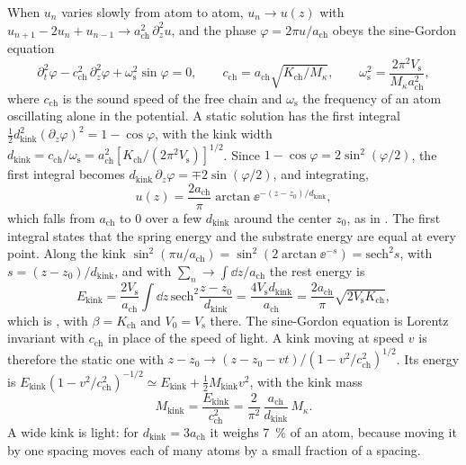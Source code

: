When $u_n$ varies slowly from atom to atom, $u_n \to u(z)$ with $u_{n+1} - 2u_n + u_{n-1} \to a_{\mathrm{ch}}^2\,\partial_z^2u$, and the phase $\varphi = 2\pi u/a_{\mathrm{ch}}$ obeys the sine-Gordon equation
\begin{equation}
  \partial_t^2\varphi - c_{\mathrm{ch}}^2\,\partial_z^2\varphi + \omega_{\mathrm{s}}^2\sin\varphi = 0, \qquad
  c_{\mathrm{ch}} = a_{\mathrm{ch}}\sqrt{K_{\mathrm{ch}}/M_\kappa}, \qquad \omega_{\mathrm{s}}^2 = \frac{2\pi^2V_{\mathrm{s}}}{M_\kappa a_{\mathrm{ch}}^2} ,
  \label{eq:C.20-sG}
\end{equation}
where $c_{\mathrm{ch}}$ is the sound speed of the free chain and $\omega_{\mathrm{s}}$ the frequency of an atom oscillating alone in the potential. A static solution has the first integral $\tfrac12d_{\mathrm{kink}}^2(\partial_z\varphi)^2 = 1 - \cos\varphi$, with the kink width $d_{\mathrm{kink}} = c_{\mathrm{ch}}/\omega_{\mathrm{s}} = a_{\mathrm{ch}}^2[K_{\mathrm{ch}}/(2\pi^2V_{\mathrm{s}})]^{1/2}$. Since $1 - \cos\varphi = 2\sin^2(\varphi/2)$, the first integral becomes $d_{\mathrm{kink}}\,\partial_z\varphi = \mp2\sin(\varphi/2)$, and integrating,
\begin{equation}
  u(z) = \frac{2a_{\mathrm{ch}}}{\pi}\arctan\ee^{-(z - z_0)/d_{\mathrm{kink}}} ,
  \label{eq:C.20-kink}
\end{equation}
which falls from $a_{\mathrm{ch}}$ to 0 over a few $d_{\mathrm{kink}}$ around the center $z_0$, as in \cite[Eq.~(2)]{fitzgerald2018structure}. The first integral states that the spring energy and the substrate energy are equal at every point. Along the kink $\sin^2(\pi u/a_{\mathrm{ch}}) = \sin^2(2\arctan\ee^{-s}) = \mathrm{sech}^2s$, with $s = (z - z_0)/d_{\mathrm{kink}}$, and with $\sum_n \to \int\dd z/a_{\mathrm{ch}}$ the rest energy is
\begin{equation}
  E_{\mathrm{kink}} = \frac{2V_{\mathrm{s}}}{a_{\mathrm{ch}}}\int\dd z\,\mathrm{sech}^2\frac{z - z_0}{d_{\mathrm{kink}}} = \frac{4V_{\mathrm{s}}d_{\mathrm{kink}}}{a_{\mathrm{ch}}} = \frac{2a_{\mathrm{ch}}}{\pi}\sqrt{2V_{\mathrm{s}}K_{\mathrm{ch}}} ,
  \label{eq:C.20-Ekink}
\end{equation}
which is \cite[Eq.~(3)]{fitzgerald2018structure}, with $\beta = K_{\mathrm{ch}}$ and $V_0 = V_{\mathrm{s}}$ there. The sine-Gordon equation is Lorentz invariant with $c_{\mathrm{ch}}$ in place of the speed of light. A kink moving at speed $v$ is therefore the static one with $z - z_0 \to (z - z_0 - vt)/(1 - v^2/c_{\mathrm{ch}}^2)^{1/2}$. Its energy is $E_{\mathrm{kink}}(1 - v^2/c_{\mathrm{ch}}^2)^{-1/2} \simeq E_{\mathrm{kink}} + \tfrac12M_{\mathrm{kink}}v^2$, with the kink mass
\begin{equation}
  M_{\mathrm{kink}} = \frac{E_{\mathrm{kink}}}{c_{\mathrm{ch}}^2} = \frac{2}{\pi^2}\,\frac{a_{\mathrm{ch}}}{d_{\mathrm{kink}}}\,M_\kappa .
  \label{eq:C.20-mass}
\end{equation}
A wide kink is light: for $d_{\mathrm{kink}} = 3a_{\mathrm{ch}}$ it weighs \SI{7}{\percent} of an atom, because moving it by one spacing moves each of many atoms by a small fraction of a spacing.

